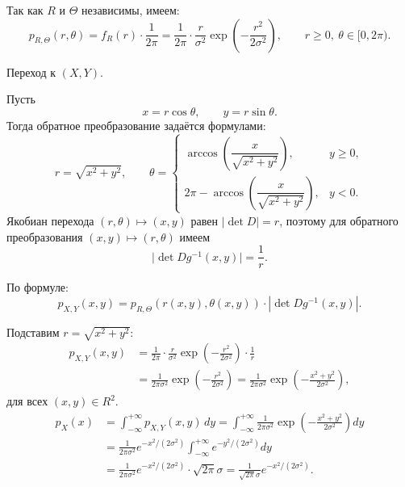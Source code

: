\documentclass[a4paper,14pt]{extarticle}
\begin{document}
            Так как $R$ и $\Theta$ независимы, имеем:
            \[
                p_{R,\Theta}(r,\theta) = f_R(r) \cdot \frac{1}{2\pi}
                = \frac{1}{2\pi} \cdot \frac{r}{\sigma^2} \exp\left(-\frac{r^2}{2\sigma^2}\right),
                \qquad r \ge 0, \ \theta \in [0, 2\pi).
            \]
            
            
            Переход к $(X,Y)$.
            
            Пусть
            \[
                x = r\cos\theta, \qquad y = r\sin\theta.
            \]
            Тогда обратное преобразование задаётся формулами:
            \[
                r = \sqrt{x^2 + y^2}, \qquad
                \theta =
                \begin{cases}
                    \arccos\!\left(\dfrac{x}{\sqrt{x^2+y^2}}\right), & y \ge 0,\\[1em]
                    2\pi - \arccos\!\left(\dfrac{x}{\sqrt{x^2+y^2}}\right), & y < 0.
                \end{cases}
            \]
            Якобиан перехода $(r,\theta) \mapsto (x,y)$ равен $|\det D| = r$, поэтому
            для обратного преобразования $(x,y) \mapsto (r,\theta)$ имеем
            \[
                \big|\det Dg^{-1}(x,y)\big| = \frac{1}{r}.
            \]
            
            По формуле:
            \[
                p_{X,Y}(x,y) = p_{R,\Theta}(r(x,y), \theta(x,y)) \cdot \left|\det Dg^{-1}(x,y)\right|.
            \]
            
            Подставим $r = \sqrt{x^2 + y^2}$:
            \[
                \begin{aligned}
                    p_{X,Y}(x,y)
                    &= \frac{1}{2\pi} \cdot \frac{r}{\sigma^2} \exp\!\left(-\frac{r^2}{2\sigma^2}\right) \cdot \frac{1}{r} \\
                    &= \frac{1}{2\pi\sigma^2} \exp\!\left(-\frac{r^2}{2\sigma^2}\right)
                    = \frac{1}{2\pi\sigma^2} \exp\!\left(-\frac{x^2 + y^2}{2\sigma^2}\right),
                \end{aligned}
            \]
            для всех $(x,y) \in R^2$.
            \[
                \begin{aligned}
                    p_X(x)
                    &= \int_{-\infty}^{+\infty} p_{X,Y}(x,y)\,dy
                    = \int_{-\infty}^{+\infty} \frac{1}{2\pi\sigma^2}
                    \exp\!\left(-\frac{x^2+y^2}{2\sigma^2}\right) dy \\
                    &= \frac{1}{2\pi\sigma^2} e^{-x^2/(2\sigma^2)}
                    \int_{-\infty}^{+\infty} e^{-y^2/(2\sigma^2)} dy \\
                    &= \frac{1}{2\pi\sigma^2} e^{-x^2/(2\sigma^2)} \cdot \sqrt{2\pi}\sigma
                    = \frac{1}{\sqrt{2\pi}\sigma} e^{-x^2/(2\sigma^2)}.
                \end{aligned}
            \]
            
\end{document}
